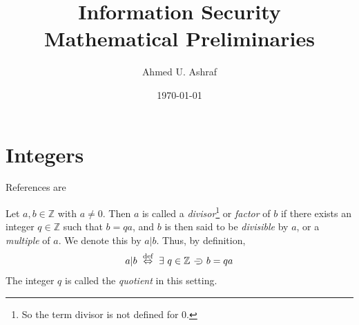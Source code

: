 \documentclass[a4paper, 12pt]{book} %
\title{Information Security \\ Mathematical Preliminaries}
\author{Ahmed U. Ashraf}
\date{\today }
\begin{document}
% 


\maketitle


\tableofcontents\label{toc}












\chapter{Integers}
\label{ch:integers}
References are \cite{slinko2015algebra, childs2019cryptology,silverman2008introduction, shemanske2017modern}


Let $a, b \in \mathbb{Z}$ with $a \neq 0$. Then $a$ is called a \emph{divisor}\footnote{So the term divisor is not defined for $0$.} or \emph{factor} of $b$ if there exists an integer $q \in \mathbb{Z}$ such that $b = qa$, and $b$ is then said to be \emph{divisible} by $a$, or a \emph{multiple} of $a$. We denote this by $a|b$. Thus, by definition,
\begin{align}
    a|b ~\overset{\text{def}}{\Leftrightarrow}~\exists~q \in \mathbb{Z} \hspace{2mm}{\supset}\kern-1em{-} \hspace{2mm} b = qa
\end{align}
The integer $q$ is called the \emph{quotient} in this setting.
\end{document}
